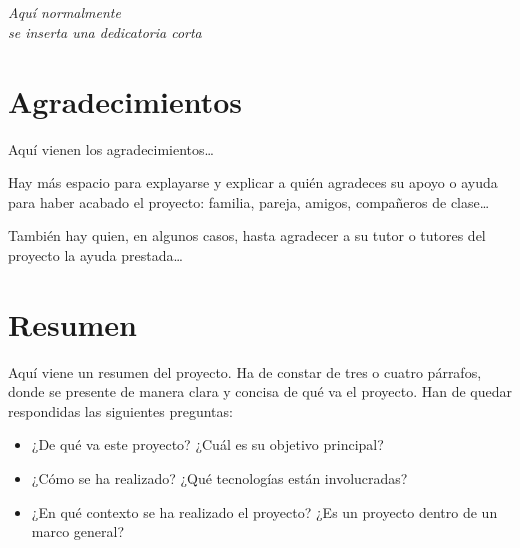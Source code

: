 \documentclass[a4paper, 12pt]{book}
\begin{document}
\chapter*{}
\begin{flushright}
\textit{Aquí normalmente \\
se inserta una dedicatoria corta \\}
\end{flushright}


\chapter*{Agradecimientos}

Aquí vienen los agradecimientos\ldots

Hay más espacio para explayarse y explicar a quién agradeces su apoyo o ayuda para
haber acabado el proyecto: familia, pareja, amigos, compañeros de clase\ldots

También hay quien, en algunos casos, hasta agradecer a su tutor o tutores del proyecto
la ayuda prestada\ldots


\chapter*{Resumen}

Aquí viene un resumen del proyecto.
Ha de constar de tres o cuatro párrafos, donde se presente de manera clara y concisa de qué va el proyecto. 
Han de quedar respondidas las siguientes preguntas:

\begin{itemize}
  \item ¿De qué va este proyecto? ¿Cuál es su objetivo principal?
  \item ¿Cómo se ha realizado? ¿Qué tecnologías están involucradas?
  \item ¿En qué contexto se ha realizado el proyecto? ¿Es un proyecto dentro de un marco general?
\end{itemize}
\end{document}
